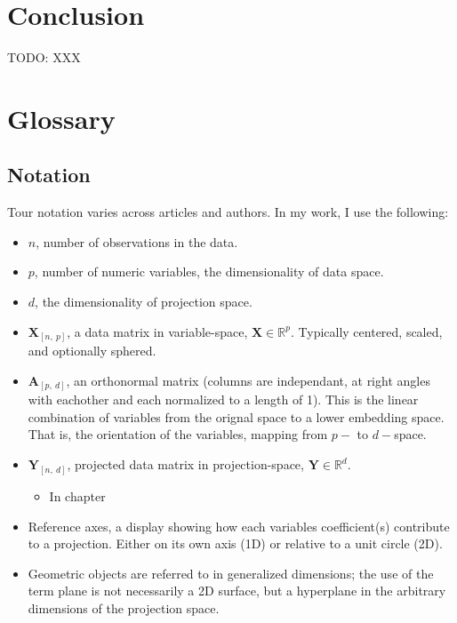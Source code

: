 \documentclass{template/monashthesis}
\begin{document}
\hypertarget{ch:conclusion}{%
\chapter{Conclusion}\label{ch:conclusion}}

TODO: XXX

\appendix

\hypertarget{ch:glossary}{%
\chapter{Glossary}\label{ch:glossary}}

\hypertarget{sec:notation}{%
\section{Notation}\label{sec:notation}}

Tour notation varies across articles and authors. In my work, I use the following:

\begin{itemize}
\tightlist
\item
  \(n\), number of observations in the data.
\item
  \(p\), number of numeric variables, the dimensionality of data space.
\item
  \(d\), the dimensionality of projection space.
\item
  \(\textbf{X}_{[n,~p]}\), a data matrix in variable-space, \(\textbf{X} \in \mathbb{R}^{p}\). Typically centered, scaled, and optionally sphered.
\item
  \(\textbf{A}_{[p,~d]}\), an orthonormal matrix (columns are independant, at right angles with eachother and each normalized to a length of 1). This is the linear combination of variables from the orignal space to a lower embedding space. That is, the orientation of the variables, mapping from \(p-\) to \(d-\)space.
\item
  \(\textbf{Y}_{[n,~d]}\), projected data matrix in projection-space, \(\textbf{Y} \in \mathbb{R}^{d}\).

  \begin{itemize}
  \tightlist
  \item
    In chapter
  \end{itemize}
\item
  Reference axes, a display showing how each variables coefficient(s) contribute to a projection. Either on its own axis (1D) or relative to a unit circle (2D).
\item
  Geometric objects are referred to in generalized dimensions; the use of the term plane is not necessarily a 2D surface, but a hyperplane in the arbitrary dimensions of the projection space.
\end{itemize}
\end{document}
